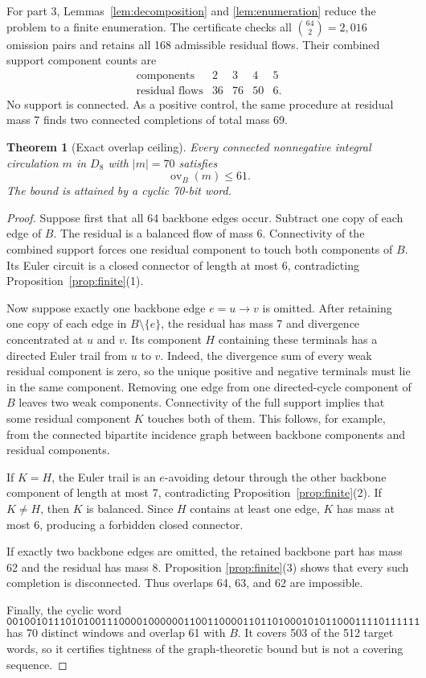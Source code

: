 \documentclass[11pt]{article}
\newtheorem{theorem}{Theorem}
\theoremstyle{definition}
\theoremstyle{remark}
\newcommand{\ov}{\operatorname{ov}}
\begin{document}
For part 3, Lemmas~\ref{lem:decomposition} and
\ref{lem:enumeration} reduce the problem to a finite enumeration.  The
certificate checks all $\binom{64}{2}=2{,}016$ omission pairs and retains
all 168 admissible residual flows.  Their combined support component
counts are
\[
\begin{array}{c|rrrr}
\text{components}&2&3&4&5\\ \hline
\text{residual flows}&36&76&50&6.
\end{array}
\]
No support is connected.  As a positive control, the same procedure at
residual mass 7 finds two connected completions of total mass 69.

\begin{theorem}[Exact overlap ceiling]
\label{thm:ceiling}
Every connected nonnegative integral circulation $m$ in $D_8$ with
$|m|=70$ satisfies
\[
  \ov_B(m)\leq 61.
\]
The bound is attained by a cyclic 70-bit word.
\end{theorem}

\begin{proof}
Suppose first that all 64 backbone edges occur.  Subtract one copy of
each edge of $B$.  The residual is a balanced flow of mass 6.
Connectivity of the combined support forces one residual component to
touch both components of $B$.  Its Euler circuit is a closed connector
of length at most 6, contradicting Proposition~\ref{prop:finite}(1).

Now suppose exactly one backbone edge $e=u\to v$ is omitted.  After
retaining one copy of each edge in $B\setminus\{e\}$, the residual has
mass 7 and divergence concentrated at $u$ and $v$.  Its component $H$
containing these terminals has a directed Euler trail from $u$ to $v$.
Indeed, the divergence sum of every weak residual component is zero, so
the unique positive and negative terminals must lie in the same
component.
Removing one edge from one directed-cycle component of $B$ leaves two
weak components.  Connectivity of the full support implies that some
residual component $K$ touches both of them.  This follows, for example,
from the connected bipartite incidence graph between backbone
components and residual components.

If $K=H$, the Euler trail is an $e$-avoiding detour through the other
backbone component of length at most 7, contradicting
Proposition~\ref{prop:finite}(2).  If $K\neq H$, then $K$ is balanced.
Since $H$ contains at least one edge, $K$ has mass at most 6, producing
a forbidden closed connector.

If exactly two backbone edges are omitted, the retained backbone part
has mass 62 and the residual has mass 8.  Proposition
\ref{prop:finite}(3) shows that every such completion is disconnected.
Thus overlaps 64, 63, and 62 are impossible.

Finally, the cyclic word
\[
\texttt{0010010111010100111000010000001100110000110110100010101100011110111111}
\]
has 70 distinct windows and overlap 61 with $B$.  It covers 503 of the
512 target words, so it certifies tightness of the graph-theoretic bound
but is not a covering sequence.
\end{proof}
\end{document}
